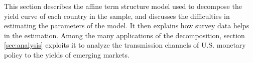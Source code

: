 This section describes the affine term structure model used to decompose 
the yield curve of each country in the sample, and discusses the difficulties in estimating the parameters of the model.
It then explains how survey data helps in the estimation.
Among the many applications of the decomposition, %
section \ref{sec:analysis} exploits it to analyze the transmission channels of U.S. monetary policy to the yields of emerging markets. %

